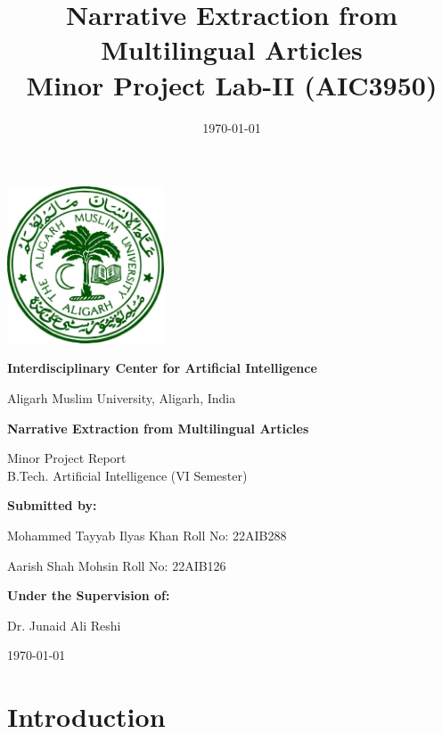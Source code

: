 \documentclass[12pt]{article}
\title{\Huge \bfseries Narrative Extraction from Multilingual Articles \\[1em] \large Minor Project Lab-II (AIC3950)}
\author{}
\date{\today}
\begin{document}
\begin{titlepage}
    \centering

    \includegraphics[width=0.35\textwidth]{images/amu_logo.jpg}\par
    \vspace{1em}
    {\large \bfseries Interdisciplinary Center for Artificial Intelligence \par}
    \vspace{0.5em}
    {\large Aligarh Muslim University, Aligarh, India\par}
    \vfill
    {\LARGE \bfseries Narrative Extraction from Multilingual Articles \par}
    \vspace{1cm}
    {\large Minor Project Report \\[0.3em]
    B.Tech. Artificial Intelligence (VI Semester)\par}
    \vfill


    {\large \bfseries Submitted by:\par}
    \vspace{0.5em}
    {\large Mohammed Tayyab Ilyas Khan \hfill Roll No: 22AIB288\par}
    {\large Aarish Shah Mohsin \hfill Roll No: 22AIB126\par}
    \vspace{1.5em}
    
    {\large \bfseries Under the Supervision of:\par}
    \vspace{0.5em}
    {\large Dr. Junaid Ali Reshi\par}

    \vfill
    {\large \today\par}
\end{titlepage}


\newpage
\tableofcontents
\newpage

\section{Introduction}
\end{document}

